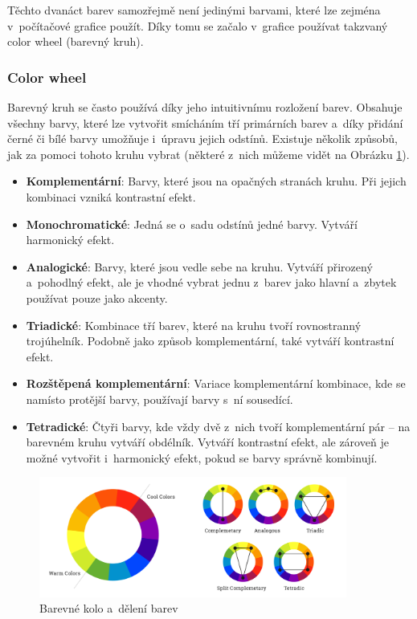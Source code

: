 Těchto dvanáct barev samozřejmě není jedinými barvami, které lze zejména v~počítačové grafice použít. Díky tomu se začalo v~grafice používat takzvaný color wheel (barevný kruh). \cite{color_theory_design}

\subsubsection*{Color wheel}
Barevný kruh se často používá díky jeho intuitivnímu rozložení barev. Obsahuje všechny barvy, které lze vytvořit smícháním tří primárních barev a~díky přidání černé či bílé barvy umožňuje i~úpravu jejich odstínů. Existuje několik způsobů, jak za pomoci tohoto kruhu vybrat (některé z~nich můžeme vidět na Obrázku \ref{fig:color_theory}). \cite{color_wheel,color_schemes}
\begin{itemize}
    \item \textbf{Komplementární}: Barvy, které jsou na opačných stranách kruhu. Při jejich kombinaci vzniká kontrastní efekt.
    \item \textbf{Monochromatické}: Jedná se o~sadu odstínů jedné barvy. Vytváří harmonický efekt.
    \item \textbf{Analogické}: Barvy, které jsou vedle sebe na kruhu. Vytváří přirozený a~pohodlný efekt, ale je vhodné vybrat jednu z~barev jako hlavní a~zbytek používat pouze jako akcenty.
    \item \textbf{Triadické}: Kombinace tří barev, které na kruhu tvoří rovnostranný trojúhelník. Podobně jako způsob komplementární, také vytváří kontrastní efekt.
    \item \textbf{Rozštěpená komplementární}: Variace komplementární kombinace, kde se namísto protější barvy, používají barvy s~ní sousedící. 
    \item \textbf{Tetradické}: Čtyři barvy, kde vždy dvě z~nich tvoří komplementární pár -- na barevném kruhu vytváří obdélník. Vytváří kontrastní efekt, ale zároveň je možné vytvořit i~harmonický efekt, pokud se barvy správně kombinují.
\end{itemize}

\begin{figure}[H]
    \centering
    \includegraphics[width=0.9\textwidth]{resources/figures/color_theory.png}
    \caption{Barevné kolo a~dělení barev \cite{color_schemes}}
    \label{fig:color_theory}
\end{figure}

